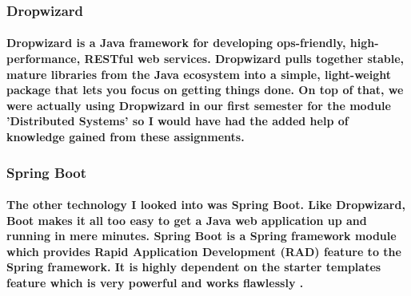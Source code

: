 \subsubsection{Dropwizard}
\paragraph{Dropwizard is a Java framework for developing ops-friendly, high-performance, RESTful web services. Dropwizard pulls together stable, mature libraries from the Java ecosystem into a simple, light-weight package that lets you focus on getting things done\cite{dropwizard}. On top of that, we were actually using Dropwizard in our first semester for the module 'Distributed Systems' so I would have had the added help of knowledge gained from these assignments.}

\subsubsection{Spring Boot}
\paragraph{The other technology I looked into was Spring Boot. Like Dropwizard, Boot makes it all too easy to get a Java web application up and running in mere minutes. Spring Boot is a Spring framework module which provides Rapid Application Development (RAD) feature to the Spring framework. It is highly dependent on the starter templates feature which is very powerful and works flawlessly \cite{boot:howto}.}

